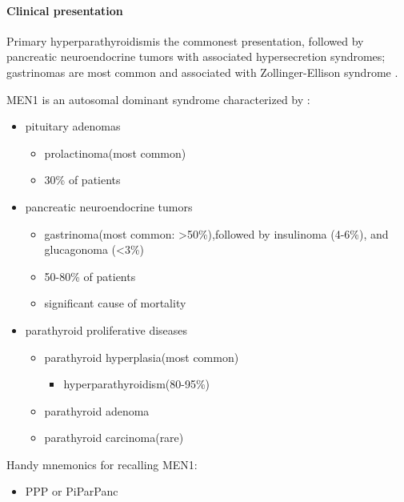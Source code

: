 \paragraph{Clinical presentation}

Primary hyperparathyroidismis the commonest presentation, followed by pancreatic neuroendocrine tumors with associated hypersecretion syndromes; gastrinomas are most common and associated with Zollinger-Ellison syndrome .

MEN1 is an autosomal dominant syndrome characterized by :

\begin{itemize}
	\item
	pituitary adenomas
	
	\begin{itemize}
		\item
		prolactinoma(most common)
		\item
		30\% of patients
	\end{itemize}
	\item
	pancreatic neuroendocrine tumors
	
	\begin{itemize}
		\item
		gastrinoma(most common: \textgreater50\%),followed by insulinoma (4-6\%), and glucagonoma (\textless3\%) 
		\item
		50-80\% of patients
		\item
		significant cause of mortality
	\end{itemize}
	\item
	parathyroid proliferative diseases
	
	\begin{itemize}
		\item
		parathyroid hyperplasia(most common)
		
		\begin{itemize}
			\item
			hyperparathyroidism(80-95\%)
		\end{itemize}
		\item
		parathyroid adenoma
		\item
		parathyroid carcinoma(rare)
	\end{itemize}
\end{itemize}

Handy mnemonics for recalling MEN1:

\begin{itemize}
	\item
	PPP or PiParPanc
\end{itemize}


